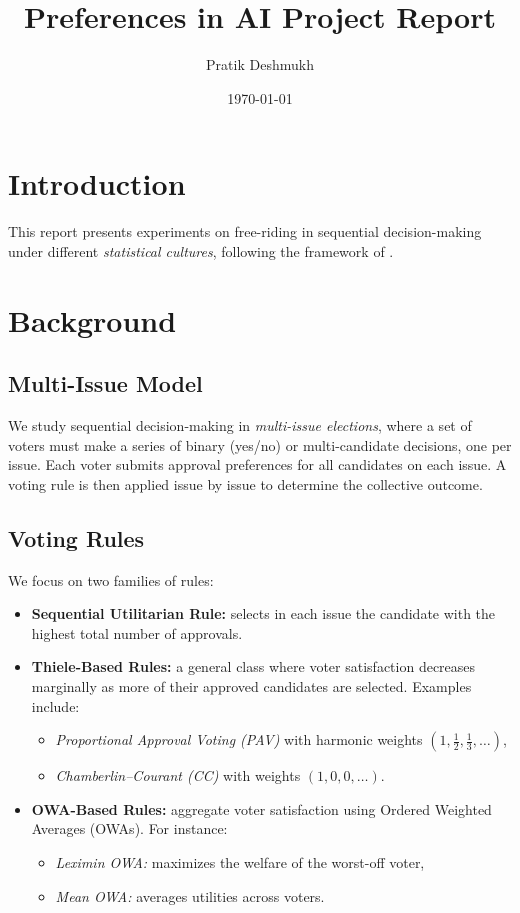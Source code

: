 \documentclass[11pt]{article}
\title{Preferences in AI Project Report}
\author{Pratik Deshmukh}
\date{\today}
\begin{document}
\maketitle

\section{Introduction}
This report presents experiments on free-riding in sequential decision-making
under different \emph{statistical cultures}, following the framework of
\cite{lackner2023freeriding}.

\section{Background}

\subsection{Multi-Issue Model}
We study sequential decision-making in \emph{multi-issue elections}, where a set
of voters must make a series of binary (yes/no) or multi-candidate decisions,
one per issue. Each voter submits approval preferences for all candidates on
each issue. A voting rule is then applied issue by issue to determine the
collective outcome.

\subsection{Voting Rules}
We focus on two families of rules:
\begin{itemize}
    \item \textbf{Sequential Utilitarian Rule:} selects in each issue the
    candidate with the highest total number of approvals.
    \item \textbf{Thiele-Based Rules:} a general class where voter satisfaction
    decreases marginally as more of their approved candidates are selected.  
    Examples include:
    \begin{itemize}
        \item \emph{Proportional Approval Voting (PAV)} with harmonic weights
        $(1, \tfrac{1}{2}, \tfrac{1}{3}, \dots)$,
        \item \emph{Chamberlin--Courant (CC)} with weights $(1,0,0,\dots)$.
    \end{itemize}
    \item \textbf{OWA-Based Rules:} aggregate voter satisfaction using Ordered
    Weighted Averages (OWAs). For instance:
    \begin{itemize}
        \item \emph{Leximin OWA:} maximizes the welfare of the worst-off voter,
        \item \emph{Mean OWA:} averages utilities across voters.
    \end{itemize}
\end{itemize}
\end{document}

